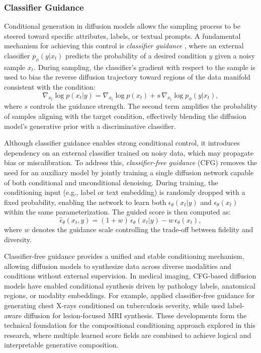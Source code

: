 \subsubsection{Classifier Guidance}

Conditional generation in diffusion models allows the sampling process to be steered toward specific attributes, labels, or textual prompts. A fundamental mechanism for achieving this control is \textit{classifier guidance} \cite{dhariwal2021classifier}, where an external classifier \( p_\phi(y|x_t) \) predicts the probability of a desired condition \( y \) given a noisy sample \( x_t \). During sampling, the classifier’s gradient with respect to the sample is used to bias the reverse diffusion trajectory toward regions of the data manifold consistent with the condition:
\begin{equation}
    \nabla_{x_t} \log p(x_t | y)
    = \nabla_{x_t} \log p(x_t)
    + s \, \nabla_{x_t} \log p_\phi(y | x_t),
\end{equation}
where \( s \) controls the guidance strength. The second term amplifies the probability of samples aligning with the target condition, effectively blending the diffusion model’s generative prior with a discriminative classifier.

Although classifier guidance enables strong conditional control, it introduces dependency on an external classifier trained on noisy data, which may propagate bias or miscalibration. To address this, \textit{classifier-free guidance} (CFG) \cite{ho2022classifierfree} removes the need for an auxiliary model by jointly training a single diffusion network capable of both conditional and unconditional denoising. During training, the conditioning input (e.g., label or text embedding) is randomly dropped with a fixed probability, enabling the network to learn both \( \epsilon_\theta(x_t | y) \) and \( \epsilon_\theta(x_t) \) within the same parameterization. The guided score is then computed as:
\begin{equation}
    \hat{\epsilon}_\theta(x_t, y)
    = (1 + w)\,\epsilon_\theta(x_t | y)
    - w\,\epsilon_\theta(x_t),
\end{equation}
where \( w \) denotes the guidance scale controlling the trade-off between fidelity and diversity.

Classifier-free guidance provides a unified and stable conditioning mechanism, allowing diffusion models to synthesize data across diverse modalities and conditions without external supervision. In medical imaging, CFG-based diffusion models have enabled conditional synthesis driven by pathology labels, anatomical regions, or modality embeddings. For example, \cite{kaur2023ddpm_xray} applied classifier-free guidance for generating chest X-rays conditioned on tuberculosis severity, while \cite{wolleb2022sddpm} used label-aware diffusion for lesion-focused MRI synthesis. These developments form the technical foundation for the compositional conditioning approach explored in this research, where multiple learned score fields are combined to achieve logical and interpretable generative composition.
